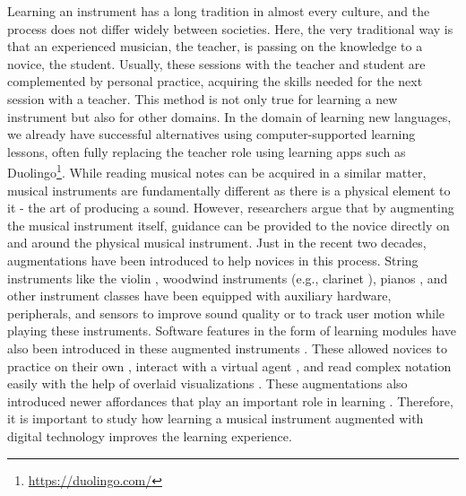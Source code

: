 \documentclass[sigconf, screen, review]{acmart}
\begin{document}
Learning an instrument has a long tradition in almost every culture, and the process does not differ widely between societies. Here, the very traditional way is that an experienced musician, the teacher, is passing on the knowledge to a novice, the student. Usually, these sessions with the teacher and student are complemented by personal practice, acquiring the skills needed for the next session with a teacher. This method is not only true for learning a new instrument but also for other domains. In the domain of learning new languages, we already have successful alternatives using computer-supported learning lessons, often fully replacing the teacher role using learning apps such as Duolingo\footnote{\url{https://duolingo.com/}}. While reading musical notes can be acquired in a similar matter, musical instruments are fundamentally different as there is a physical element to it - the art of producing a sound. However, researchers argue that by augmenting the musical instrument itself, guidance can be provided to the novice directly on and around the physical musical instrument. Just in the recent two decades, augmentations have been introduced to help novices in this process. String instruments like the violin \cite{overholt2005overtone}, woodwind instruments (e.g., clarinet \cite{silva2008interaction}), pianos \cite{mcpherson2010augmenting}, and other instrument classes \cite{turchet2018some, newton2011examining} have been equipped with auxiliary hardware, peripherals, and sensors to improve sound quality or to track user motion while playing these instruments. Software features in the form of learning modules have also been introduced in these augmented instruments \cite{}. These allowed novices to practice on their own \cite{fober2007vemus}, interact with a virtual agent \cite{costalonga2008agent, tidemann2009groovy}, and read complex notation easily with the help of overlaid visualizations \cite{trujano2018arpiano, gerry2019adept, santiniaugmented}. These augmentations also introduced newer affordances that play an important role in learning \cite{dede1996evolution}. Therefore, it is important to study how learning a musical instrument augmented with digital technology improves the learning experience.
\end{document}
